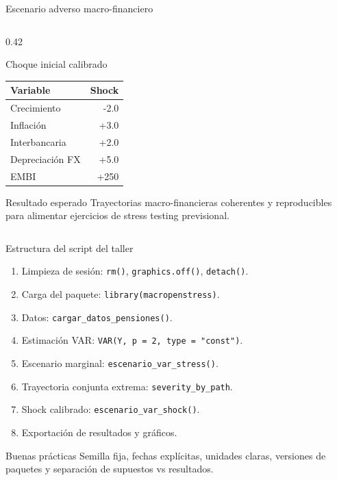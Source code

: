 \documentclass[10pt,aspectratio=169]{beamer}
\begin{document}
\begin{frame}{Escenario adverso macro-financiero}
\begin{columns}[T]
\begin{column}{0.42\textwidth}
\begin{block}{Choque inicial calibrado}
\begin{table}
\footnotesize
\centering
\begin{tabular}{lr}
\toprule
Variable & Shock \\
\midrule
Crecimiento & -2.0 \\
Inflación & +3.0 \\
Interbancaria & +2.0 \\
Depreciación FX & +5.0 \\
EMBI & +250 \\
\bottomrule
\end{tabular}
\end{table}

\end{block}

\footnotesize
\begin{alertblock}{Resultado esperado}
Trayectorias macro-financieras coherentes y reproducibles para alimentar ejercicios de stress testing previsional.
\end{alertblock}

\end{column}

\end{columns}

\end{frame}
\begin{frame}{Estructura del script del taller}
\begin{enumerate}
  \item Limpieza de sesión: \texttt{rm()}, \texttt{graphics.off()}, \texttt{detach()}.
  \item Carga del paquete: \texttt{library(macropenstress)}.
  \item Datos: \texttt{cargar\_datos\_pensiones()}.
  \item Estimación VAR: \texttt{VAR(Y, p = 2, type = "const")}.
  \item Escenario marginal: \texttt{escenario\_var\_stress()}.
  \item Trayectoria conjunta extrema: \texttt{severity\_by\_path}.
  \item Shock calibrado: \texttt{escenario\_var\_shock()}.
  \item Exportación de resultados y gráficos.
\end{enumerate}

\vspace{0.4em}
\begin{block}{Buenas prácticas}
Semilla fija, fechas explícitas, unidades claras, versiones de paquetes y separación de supuestos vs resultados.
\end{block}
\end{frame}
\end{document}
